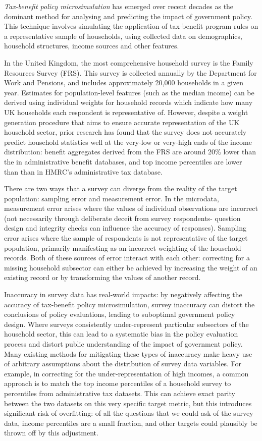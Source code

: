\documentclass{article}
\begin{document}
\emph{Tax-benefit policy microsimulation} has emerged over recent decades as the dominant method for analysing and predicting the impact of government policy. This technique involves simulating the application of tax-benefit program rules on a representative sample of households, using collected data on demographics, household structures, income sources and other features.

In the United Kingdom, the most comprehensive household survey is the Family Resources Survey (FRS). This survey is collected annually by the Department for Work and Pensions, and includes approximately 20,000 households in a given year. Estimates for population-level features (such as the median income) can be derived using individual weights for household records which indicate how many UK households each respondent is representative of. However, despite a weight generation procedure that aims to ensure accurate representation of the UK household sector, prior research has found that the survey does not accurately predict household statistics well at the very-low or very-high ends of the income distribution: benefit aggregates derived from the FRS are around 20\% lower than the in administrative benefit databases, and top income percentiles are lower than than in HMRC's administrative tax database.

There are two ways that a survey can diverge from the reality of the target population: sampling error and measurement error. In the microdata, measurement error arises where the values of individual observations are incorrect (not necessarily through deliberate deceit from survey respondents- question design and integrity checks can influence the accuracy of responses). Sampling error arises where the sample of respondents is not representative of the target population, primarily manifesting as an incorrect weighting of the household records. Both of these sources of error interact with each other: correcting for a missing household subsector can either be achieved by increasing the weight of an existing record or by transforming the values of another record.

Inaccuracy in survey data has real-world impacts: by negatively affecting the accuracy of tax-benefit policy microsimulation, survey inaccuracy can distort the conclusions of policy evaluations, leading to suboptimal government policy design. Where surveys consistently under-represent particular subsectors of the household sector, this can lead to a systematic bias in the policy evaluation process and distort public understanding of the impact of government policy. Many existing methods for mitigating these types of inaccuracy make heavy use of arbitrary assumptions about the distribution of survey data variables. For example, in correcting for the under-representation of high incomes, a common approach is to match the top income percentiles of a household survey to percentiles from administrative tax datasets. This can achieve exact parity between the two datasets on this very specific target metric, but this introduces significant risk of overfitting: of all the questions that we could ask of the survey data, income percentiles are a small fraction, and other targets could plausibly be thrown off by this adjustment.
\end{document}
